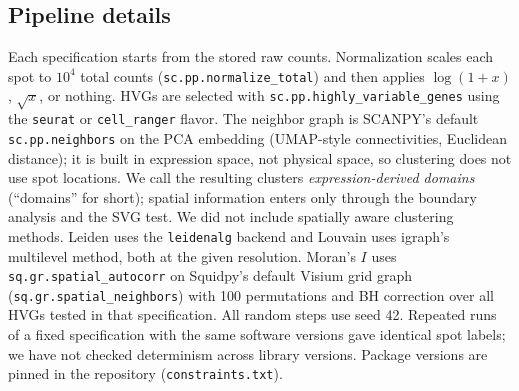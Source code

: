 \documentclass[conference]{IEEEtran}
\begin{document}
\subsection{Pipeline details}
Each specification starts from the stored raw counts. Normalization scales
each spot to $10^4$ total counts (\texttt{sc.pp.normalize\_total}) and then
applies $\log(1+x)$, $\sqrt{x}$, or nothing. HVGs are selected with
\texttt{sc.pp.highly\_variable\_genes} using the \texttt{seurat} or
\texttt{cell\_ranger} flavor. The neighbor graph is SCANPY's default
\texttt{sc.pp.neighbors} on the PCA embedding (UMAP-style connectivities,
Euclidean distance); it is built in expression space, not physical space,
so clustering does not use spot locations. We call the resulting clusters
\emph{expression-derived domains} (``domains'' for short); spatial
information enters only through the boundary analysis and the SVG test.
We did not include spatially aware clustering methods. Leiden uses the
\texttt{leidenalg} backend and Louvain uses igraph's multilevel method,
both at the given resolution. Moran's $I$ uses
\texttt{sq.gr.spatial\_autocorr} on Squidpy's default Visium grid graph
(\texttt{sq.gr.spatial\_neighbors}) with 100 permutations and BH
correction over all HVGs tested in that specification. All random steps
use seed 42. Repeated runs of a fixed specification with the same
software versions gave identical spot labels; we have not checked
determinism across library versions. Package versions are pinned in the
repository (\texttt{constraints.txt}).
\end{document}
